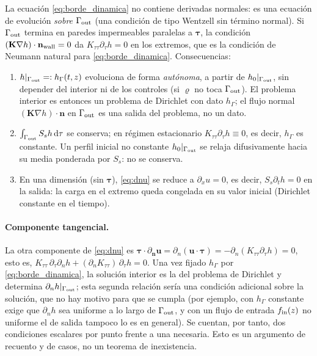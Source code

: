 \documentclass[11pt]{article}
\numberwithin{equation}{section}
\theoremstyle{plain}
\theoremstyle{definition}
\theoremstyle{remark}
\newcommand{\bu}{\mathbf{u}}
\newcommand{\bK}{\mathbf{K}}
\newcommand{\bn}{\mathbf{n}}
\newcommand{\Nuc}{\varrho}                      %
\newcommand{\dd}{\,\mathrm d}
\begin{document}
La ecuación \eqref{eq:borde_dinamica} no contiene derivadas normales: es una ecuación de evolución \emph{sobre} $\Gamma_{\rm out}$ (una condición de tipo
Wentzell sin término normal). Si $\Gamma_{\rm out}$ termina en paredes impermeables paralelas a $\boldsymbol\tau$, la condición $(\bK\nabla h)\cdot\bn_{\rm wall}=0$
da $K_{\tau\tau}\partial_\tau h=0$ en los extremos, que es la condición de Neumann natural para \eqref{eq:borde_dinamica}. Consecuencias:
\begin{enumerate}[label=(\roman*),nosep]
\item $h|_{\Gamma_{\rm out}}=:h_\Gamma(t,z)$ evoluciona de forma \emph{autónoma}, a partir de $h_0|_{\Gamma_{\rm out}}$, sin depender del interior ni de los controles (si $\Nuc$ no toca $\Gamma_{\rm out}$).
El problema interior es entonces un problema de Dirichlet con dato $h_\Gamma$; el flujo normal $(\bK\nabla h)\cdot\bn$ en $\Gamma_{\rm out}$ es una salida del problema, no un dato.
\item $\int_{\Gamma_{\rm out}}S_sh\dd\tau$ se conserva; en régimen estacionario $K_{\tau\tau}\partial_\tau h\equiv0$, es decir, $h_\Gamma$ es constante. Un perfil inicial no constante
$h_0|_{\Gamma_{\rm out}}$ se relaja difusivamente hacia su media ponderada por $S_s$: no se conserva.
\item En una dimensión (sin $\boldsymbol\tau$), \eqref{eq:dnu} se reduce a $\partial_x u=0$, es decir, $S_s\partial_th=0$ en la salida: la carga en el extremo queda congelada en su valor inicial
(Dirichlet constante en el tiempo).
\end{enumerate}

\paragraph{Componente tangencial.} La otra componente de \eqref{eq:dnu} es $\boldsymbol\tau\cdot\partial_{\bn}\bu=\partial_n(\bu\cdot\boldsymbol\tau)=-\partial_n(K_{\tau\tau}\partial_\tau h)=0$,
esto es, $K_{\tau\tau}\,\partial_\tau\partial_nh+(\partial_nK_{\tau\tau})\,\partial_\tau h=0$. Una vez fijado $h_\Gamma$ por \eqref{eq:borde_dinamica}, la solución interior es la del problema de Dirichlet
y determina $\partial_nh|_{\Gamma_{\rm out}}$; esta segunda relación sería una condición adicional sobre la solución, que no hay motivo para que se cumpla (por ejemplo,
con $h_\Gamma$ constante exige que $\partial_nh$ sea uniforme a lo largo de $\Gamma_{\rm out}$, y con un flujo de entrada $f_{\rm in}(z)$ no uniforme el de salida tampoco lo es en general).
Se cuentan, por tanto, dos condiciones escalares por punto frente a una necesaria. Esto es un argumento de recuento y de casos, no un teorema de inexistencia.
\end{document}

